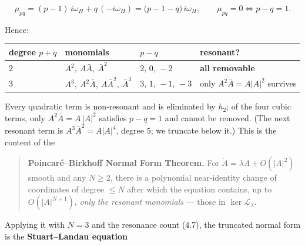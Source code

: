 \documentclass[
  11pt,
]{article}
\newcounter{none} %
\begin{document}
\[
\mu_{pq}=(p-1)\,i\omega_H+q\,(-i\omega_H)=\big(p-1-q\big)\,i\omega_H,
\qquad
\mu_{pq}=0\iff p-q=1 .
\tag{4.7}
\]

Hence:

{\def\LTcaptype{none} %
\begin{longtable}[]{@{}
  >{\raggedright\arraybackslash}p{}
  >{\raggedright\arraybackslash}p{}
  >{\raggedright\arraybackslash}p{}
  >{\raggedright\arraybackslash}p{}@{}}
\toprule\noalign{}
\begin{minipage}[b]{\linewidth}\raggedright
degree \(p+q\)
\end{minipage} & \begin{minipage}[b]{\linewidth}\raggedright
monomials
\end{minipage} & \begin{minipage}[b]{\linewidth}\raggedright
\(p-q\)
\end{minipage} & \begin{minipage}[b]{\linewidth}\raggedright
resonant?
\end{minipage} \\
\midrule\noalign{}
\endhead
\bottomrule\noalign{}
\endlastfoot
\(2\) & \(A^2,\ A\bar A,\ \bar A^2\) & \(2,\,0,\,-2\) & \textbf{all
removable} \\
\(3\) & \(A^3,\ A^2\bar A,\ A\bar A^2,\ \bar A^3\) & \(3,\,1,\,-1,\,-3\)
& only \(A^2\bar A=A|A|^2\) survives \\
\end{longtable}
}

Every quadratic term is non‑resonant and is eliminated by \(h_2\); of
the four cubic terms, only \(A^2\bar A=A\,|A|^2\) satisfies \(p-q=1\)
and cannot be removed. (The next resonant term is
\(A^3\bar A^2=A|A|^4\), degree \(5\); we truncate below it.) This is the
content of the

\begin{quote}
\textbf{Poincaré--Birkhoff Normal Form Theorem.} For
\(\dot A=\lambda A+O(|A|^2)\) smooth and any \(N\ge 2\), there is a
polynomial near‑identity change of coordinates of degree \(\le N\) after
which the equation contains, up to \(O(|A|^{N+1})\), \emph{only the
resonant monomials} --- those in \(\ker\mathcal L_\lambda\).
\end{quote}

Applying it with \(N=3\) and the resonance count (4.7), the truncated
normal form is the \textbf{Stuart--Landau equation}
\end{document}

